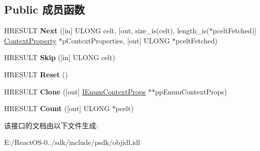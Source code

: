 \subsection*{Public 成员函数}
\begin{DoxyCompactItemize}
\item 
\mbox{\label{interface_i_enum_context_props_ae722c00f678b8d7ee9fe270942339089}} 
H\+R\+E\+S\+U\+LT {\bfseries Next} (\mbox{[}in\mbox{]} U\+L\+O\+NG celt, \mbox{[}out, size\+\_\+is(celt), length\+\_\+is($\ast$pcelt\+Fetched)\mbox{]} \hyperlink{structtag_context_property}{Context\+Property} $\ast$p\+Context\+Properties, \mbox{[}out\mbox{]} U\+L\+O\+NG $\ast$pcelt\+Fetched)
\item 
\mbox{\label{interface_i_enum_context_props_a5d909f4c0f0abd2a6b580effafae2d5c}} 
H\+R\+E\+S\+U\+LT {\bfseries Skip} (\mbox{[}in\mbox{]} U\+L\+O\+NG celt)
\item 
\mbox{\label{interface_i_enum_context_props_a2b7f50812d739517b50a51b3f2f6c503}} 
H\+R\+E\+S\+U\+LT {\bfseries Reset} ()
\item 
\mbox{\label{interface_i_enum_context_props_a37bf8615fe80d97347a7402bb699391b}} 
H\+R\+E\+S\+U\+LT {\bfseries Clone} (\mbox{[}out\mbox{]} \hyperlink{interface_i_enum_context_props}{I\+Enum\+Context\+Props} $\ast$$\ast$pp\+Enum\+Context\+Props)
\item 
\mbox{\label{interface_i_enum_context_props_a1fba1b3226bbdff0a009f00afc22d489}} 
H\+R\+E\+S\+U\+LT {\bfseries Count} (\mbox{[}out\mbox{]} U\+L\+O\+NG $\ast$pcelt)
\end{DoxyCompactItemize}


该接口的文档由以下文件生成\+:\begin{DoxyCompactItemize}
\item 
E\+:/\+React\+O\+S-\/0../sdk/include/psdk/objidl.\+idl\end{DoxyCompactItemize}
